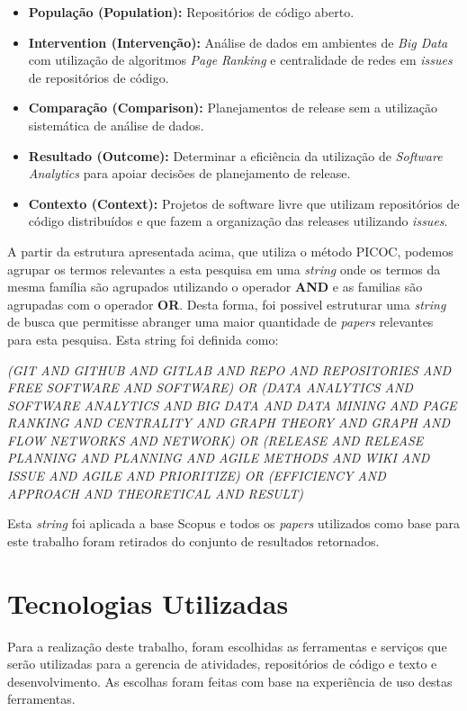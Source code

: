 \begin{itemize}
    \item \textbf{População (Population):} Repositórios de código aberto.
    \item \textbf{Intervention (Intervenção):} Análise de dados em ambientes de
        \textit{Big Data} com utilização de algoritmos \textit{Page Ranking} e
        centralidade de redes em \textit{issues} de repositórios de código.
    \item \textbf{Comparação (Comparison):} Planejamentos de release sem a utilização
        sistemática de análise de dados.
    \item \textbf{Resultado  (Outcome):} Determinar a eficiência da utilização de
        \textit{Software Analytics} para apoiar decisões de planejamento de release.
    \item \textbf{Contexto (Context):} Projetos de software livre que utilizam
        repositórios de código distribuídos e que fazem a organização das releases
        utilizando \textit{issues}.
\end{itemize}


A partir da estrutura apresentada acima, que utiliza o método PICOC, podemos agrupar
os termos relevantes a esta pesquisa em uma \textit{string} onde os termos da mesma
família são agrupados utilizando o operador \textbf{AND} e as familias são agrupadas
com o operador \textbf{OR}. Desta forma, foi possivel estruturar uma \textit{string} 
de busca que permitisse abranger uma maior quantidade de \textit{papers} relevantes 
para esta pesquisa. Esta string foi definida como:

\begin{center}
    \textit{(GIT AND GITHUB AND GITLAB AND REPO AND REPOSITORIES AND FREE
    SOFTWARE AND SOFTWARE) OR (DATA ANALYTICS AND SOFTWARE ANALYTICS AND BIG DATA
    AND DATA MINING AND PAGE RANKING AND CENTRALITY AND GRAPH THEORY AND GRAPH AND
    FLOW NETWORKS AND NETWORK) OR (RELEASE AND RELEASE PLANNING AND PLANNING AND
    AGILE METHODS AND WIKI AND ISSUE AND AGILE AND PRIORITIZE) OR (EFFICIENCY AND 
    APPROACH AND THEORETICAL AND RESULT)}
\end{center}

Esta \textit{string} foi aplicada a base Scopus e todos os \textit{papers} 
utilizados como base para este trabalho foram retirados do conjunto de resultados
retornados.

\section{Tecnologias Utilizadas}
\label{met:tec}
Para a realização deste trabalho, foram escolhidas as ferramentas e serviços
que serão utilizadas para a gerencia de atividades, repositórios de código e
texto e desenvolvimento. As escolhas foram feitas com base na experiência de uso
destas ferramentas.

